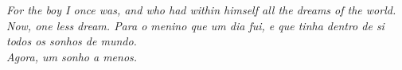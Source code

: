 


\begin{dedicatoria}

    \vspace*{\fill}
    \centering
    \noindent
    \textit{\lang
    {
        For the boy I once was, and who had within himself all the dreams of the world.\\[\baselineskip]
        Now, one less dream.
    }
    {
        Para o menino que um dia fui, e que tinha dentro de si todos os sonhos de mundo.\\[\baselineskip]
        Agora, um sonho a menos.
    }}
    \vspace*{\fill}



\end{dedicatoria}



